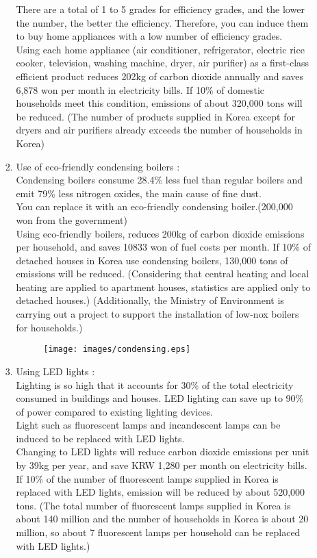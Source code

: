 \documentclass[11pt, conference]{IEEEtran}
\begin{document}
\begin{enumerate}[label=\arabic*]
\begin{enumerate}[label=\alph*]
\begin{enumerate}[label=\roman*]
            There are a total of 1 to 5 grades for efficiency grades, and the lower the number, the better the efficiency. Therefore, you can induce them to buy home appliances with a low number of efficiency grades.\\
            Using each home appliance (air conditioner, refrigerator, electric rice cooker, television, washing machine, dryer, air purifier) as a first-class efficient product reduces 202kg of carbon dioxide annually and saves 6,878 won per month in electricity bills. If 10\% of domestic households meet this condition, emissions of about 320,000 tons will be reduced. (The number of products supplied in Korea except for dryers and air purifiers already exceeds the number of households in Korea)
            \item Use of eco-friendly condensing boilers : \\
            Condensing boilers consume 28.4\% less fuel than regular boilers and emit 79\% less nitrogen oxides, the main cause of fine dust.\\
            You can replace it with an eco-friendly condensing boiler.(200,000 won from the government)\\
            Using eco-friendly boilers, reduces 200kg of carbon dioxide emissions per household, and saves 10833 won of fuel costs per month. If 10\% of detached houses in Korea use condensing boilers, 130,000 tons of emissions will be reduced. (Considering that central heating and local heating are applied to apartment houses, statistics are applied only to detached houses.) (Additionally, the Ministry of Environment is carrying out a project to support the installation of low-nox boilers for households.)
            \begin{figure}[H]
                \centering
                \texttt{[image: images/condensing.eps]}
            \end{figure}
            \item Using LED lights : \\
            Lighting is so high that it accounts for 30\% of the total electricity consumed in buildings and houses. LED lighting can save up to 90\% of power compared to existing lighting devices.\\
            Light such as fluorescent lamps and incandescent lamps can be induced to be replaced with LED lights.\\
            Changing to LED lights will reduce carbon dioxide emissions per unit by 39kg per year, and save KRW 1,280 per month on electricity bills. If 10\% of the number of fluorescent lamps supplied in Korea is replaced with LED lights, emission will be reduced by about 520,000 tons. (The total number of fluorescent lamps supplied in Korea is about 140 million and the number of households in Korea is about 20 million, so about 7 fluorescent lamps per household can be replaced with LED lights.)

\end{enumerate}
\end{enumerate}
\end{enumerate}
\end{document}
